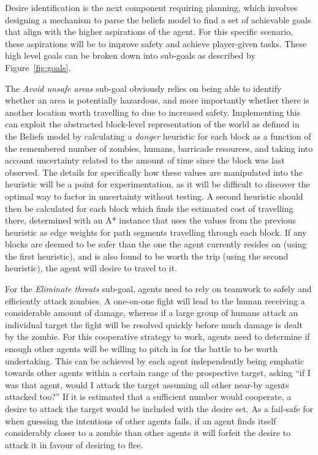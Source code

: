 \documentclass[12pt,a4paper]{article}
\begin{document}
Desire identification is the next component requiring planning, which involves designing a mechanism to parse the beliefs model to find a set of achievable goals that align with the higher aspirations of the agent. For this specific scenario, these aspirations will be to improve safety and achieve player-given tasks. These high level goals can be broken down into sub-goals as described by Figure~\ref{fig:goals}.

The \emph{Avoid unsafe areas} sub-goal obviously relies on being able to identify whether an area is potentially hazardous, and more importantly whether there is another location worth travelling to due to increased safety. Implementing this can exploit the abstracted block-level representation of the world as defined in the Beliefs model by calculating a \emph{danger} heuristic for each block as a function of the remembered number of zombies, humans, barricade resources, and taking into account uncertainty related to the amount of time since the block was last observed. The details for specifically how these values are manipulated into the heuristic will be a point for experimentation, as it will be difficult to discover the optimal way to factor in uncertainty without testing. A second heuristic should then be calculated for each block which finds the estimated cost of travelling there, determined with an A* instance that uses the values from the previous heuristic as edge weights for path segments travelling through each block. If any blocks are deemed to be safer than the one the agent currently resides on (using the first heuristic), and is also found to be worth the trip (using the second heuristic), the agent will desire to travel to it.

For the \emph{Eliminate threats} sub-goal, agents need to rely on teamwork to safely and efficiently attack zombies. A one-on-one fight will lead to the human receiving a considerable amount of damage, whereas if a large group of humans attack an individual target the fight will be resolved quickly before much damage is dealt by the zombie. For this cooperative strategy to work, agents need to determine if enough other agents will be willing to pitch in for the battle to be worth undertaking. This can be achieved by each agent independently being emphatic towards other agents within a certain range of the prospective target, asking ``if I was that agent, would I attack the target assuming all other near-by agents attacked too?'' If it is estimated that a sufficient number would cooperate, a desire to attack the target would be included with the desire set. As a fail-safe for when guessing the intentions of other agents fails, if an agent finds itself considerably closer to a zombie than other agents it will forfeit the desire to attack it in favour of desiring to flee.
\end{document}
